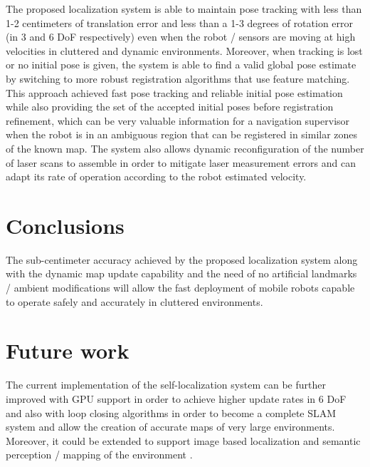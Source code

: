 \documentclass[9pt,a4paper]{extarticle}
\begin{document}
\begin{multicols}{2}
The proposed localization system is able to maintain pose tracking with less than 1-2 centimeters of translation error and less than a 1-3 degrees of rotation error (in 3 and 6 DoF respectively) even when the robot / sensors are moving at high velocities in cluttered and dynamic environments. Moreover, when tracking is lost or no initial pose is given, the system is able to find a valid global pose estimate by switching to more robust registration algorithms that use feature matching. This approach achieved fast pose tracking and reliable initial pose estimation while also providing the set of the accepted initial poses before registration refinement, which can be very valuable information for a navigation supervisor when the robot is in an ambiguous region that can be registered in similar zones of the known map. The system also allows dynamic reconfiguration of the number of laser scans to assemble in order to mitigate laser measurement errors and can adapt its rate of operation according to the robot estimated velocity.


\section{Conclusions}

The sub-centimeter accuracy achieved by the proposed localization system along with the dynamic map update capability and the need of no artificial landmarks / ambient modifications will allow the fast deployment of mobile robots capable to operate safely and accurately in cluttered environments.


\section{Future work}

The current implementation of the self-localization system can be further improved with GPU support \cite{Tamaki2010} in order to achieve higher update rates in 6 DoF and also with loop closing algorithms \cite{Grisetti2012} in order to become a complete SLAM system and allow the creation of accurate maps of very large environments. Moreover, it could be extended to support image based localization \cite{Labb2014} and semantic perception / mapping of the environment \cite{Santos2013}.





\end{multicols}
\end{document}
